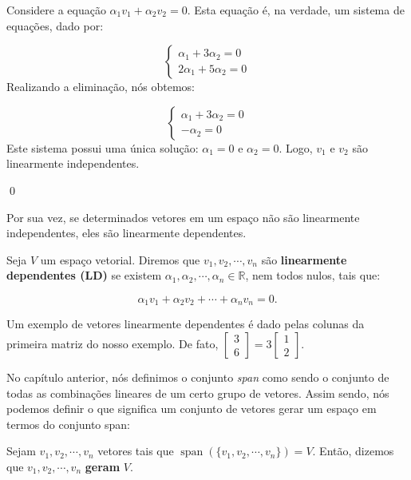 \begin{Proof}
	Considere a equação $\alpha_1v_1 + \alpha_2v_2 = 0$. Esta equação é, na verdade, um sistema de equações, dado por:
	
	$$
	\begin{cases}
		\alpha_1 + 3\alpha_2 = 0 \\
		2\alpha_1 + 5\alpha_2 = 0
	\end{cases}
	$$
	Realizando a eliminação, nós obtemos:
	
	$$
	\begin{cases}
		\alpha_1 + 3\alpha_2 = 0 \\
		-\alpha_2 = 0
	\end{cases}
	$$
	Este sistema possui uma única solução: $\alpha_1 = 0$ e $\alpha_2 = 0$. Logo, $v_1$ e $v_2$ são linearmente independentes.
	
	\qed
\end{Proof}

Por sua vez, se determinados vetores em um espaço não são linearmente independentes, eles são linearmente dependentes.

\begin{Definition}
	Seja $V$ um espaço vetorial. Diremos que $v_1, v_2, \cdots, v_n$ são \textbf{linearmente dependentes (LD)} se existem $\alpha_1, \alpha_2, \cdots, \alpha_n\in\mathbb{R}$, nem todos nulos, tais que:
	
	$$
	\alpha_1v_1 + \alpha_2v_2 + \cdots + \alpha_nv_n = 0.
	$$
\end{Definition}

Um exemplo de vetores linearmente dependentes é dado pelas colunas da primeira matriz do nosso exemplo. De fato, $\begin{bmatrix}
	3 \\
	6
\end{bmatrix} = 3\begin{bmatrix}
 	1 \\
 	2
\end{bmatrix}$.

No capítulo anterior, nós definimos o conjunto \textit{span} como sendo o conjunto de todas as combinações lineares de um certo grupo de vetores. Assim sendo, nós podemos definir o que significa um conjunto de vetores gerar um espaço em termos do conjunto span:

\begin{Definition}[Gerador]
	Sejam $v_1, v_2, \cdots, v_n$ vetores tais que $\operatorname{span}(\{v_1, v_2, \cdots, v_n\}) = V$. Então, dizemos que $v_1, v_2, \cdots, v_n$ \textbf{geram} $V$.
\end{Definition}

